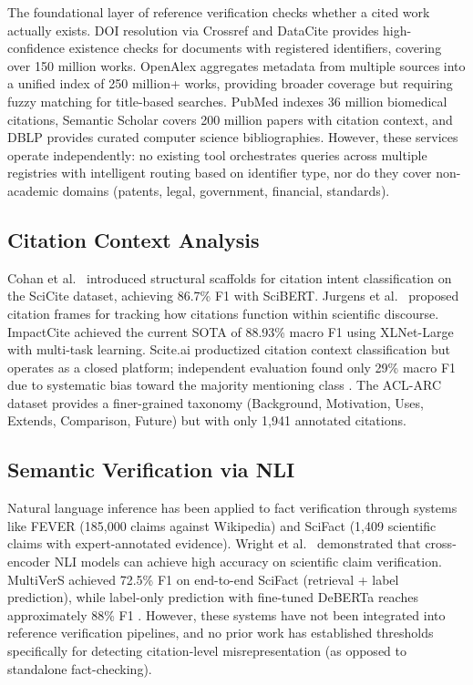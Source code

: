 \documentclass[sigconf,nonacm]{acmart}
\begin{document}
The foundational layer of reference verification checks whether a cited work actually exists.
DOI resolution via Crossref \cite{crossref2024} and DataCite provides high-confidence existence checks for documents with registered identifiers, covering over 150 million works.
OpenAlex \cite{priem2022openalex} aggregates metadata from multiple sources into a unified index of 250 million+ works, providing broader coverage but requiring fuzzy matching for title-based searches.
PubMed indexes 36 million biomedical citations, Semantic Scholar \cite{kinney2023semantic} covers 200 million papers with citation context, and DBLP provides curated computer science bibliographies.
However, these services operate independently: no existing tool orchestrates queries across multiple registries with intelligent routing based on identifier type, nor do they cover non-academic domains (patents, legal, government, financial, standards).

\subsection{Citation Context Analysis}

Cohan et al.\ \cite{cohan2019structural} introduced structural scaffolds for citation intent classification on the SciCite dataset, achieving 86.7\% F1 with SciBERT.
Jurgens et al.\ \cite{jurgens2018measuring} proposed citation frames for tracking how citations function within scientific discourse.
ImpactCite \cite{impactcite2020} achieved the current SOTA of 88.93\% macro F1 using XLNet-Large with multi-task learning.
Scite.ai \cite{scite2019} productized citation context classification but operates as a closed platform; independent evaluation found only 29\% macro F1 due to systematic bias toward the majority mentioning class \cite{bakker2023}.
The ACL-ARC dataset \cite{jurgens2018measuring} provides a finer-grained taxonomy (Background, Motivation, Uses, Extends, Comparison, Future) but with only 1,941 annotated citations.

\subsection{Semantic Verification via NLI}

Natural language inference has been applied to fact verification through systems like FEVER \cite{thorne2018fever} (185,000 claims against Wikipedia) and SciFact \cite{wadden2020fact} (1,409 scientific claims with expert-annotated evidence).
Wright et al.\ \cite{wright2022generating} demonstrated that cross-encoder NLI models can achieve high accuracy on scientific claim verification.
MultiVerS \cite{multivers2022} achieved 72.5\% F1 on end-to-end SciFact (retrieval + label prediction), while label-only prediction with fine-tuned DeBERTa reaches approximately 88\% F1 \cite{kosprdic2024}.
However, these systems have not been integrated into reference verification pipelines, and no prior work has established thresholds specifically for detecting citation-level misrepresentation (as opposed to standalone fact-checking).
\end{document}
